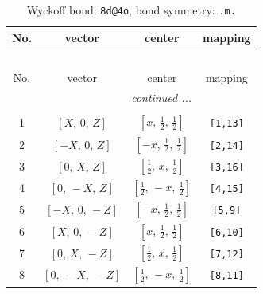 \documentclass[fleqn,8pt]{jsarticle}
\begin{document}
\begin{longtable}{cccc}
\caption{Wyckoff bond: {\tt 8d@4o}, bond symmetry: {\tt .m.}}
 \\
 \hline \hline
No. & vector & center & mapping \\ \hline \endfirsthead

\multicolumn{3}{l}{\tablename\ \thetable{}} \\
 \hline \hline
No. & vector & center & mapping \\ \hline \endhead

 \hline \hline
\multicolumn{3}{r}{\footnotesize\it continued ...} \\ \endfoot

 \hline \hline
\multicolumn{3}{r}{} \\ \endlastfoot

1 & $\left[ X,\, 0,\, Z \right]$ & $\left[ x,\, \frac{1}{2},\, \frac{1}{2} \right]$ & {\tt [1,13]} \\ \hline
2 & $\left[ - X,\, 0,\, Z \right]$ & $\left[ - x,\, \frac{1}{2},\, \frac{1}{2} \right]$ & {\tt [2,14]} \\ \hline
3 & $\left[ 0,\, X,\, Z \right]$ & $\left[ \frac{1}{2},\, x,\, \frac{1}{2} \right]$ & {\tt [3,16]} \\ \hline
4 & $\left[ 0,\, - X,\, Z \right]$ & $\left[ \frac{1}{2},\, - x,\, \frac{1}{2} \right]$ & {\tt [4,15]} \\ \hline
5 & $\left[ - X,\, 0,\, - Z \right]$ & $\left[ - x,\, \frac{1}{2},\, \frac{1}{2} \right]$ & {\tt [5,9]} \\ \hline
6 & $\left[ X,\, 0,\, - Z \right]$ & $\left[ x,\, \frac{1}{2},\, \frac{1}{2} \right]$ & {\tt [6,10]} \\ \hline
7 & $\left[ 0,\, X,\, - Z \right]$ & $\left[ \frac{1}{2},\, x,\, \frac{1}{2} \right]$ & {\tt [7,12]} \\ \hline
8 & $\left[ 0,\, - X,\, - Z \right]$ & $\left[ \frac{1}{2},\, - x,\, \frac{1}{2} \right]$ & {\tt [8,11]} \\
\end{longtable}
\renewcommand{\arraystretch}{1.2}
\end{document}

